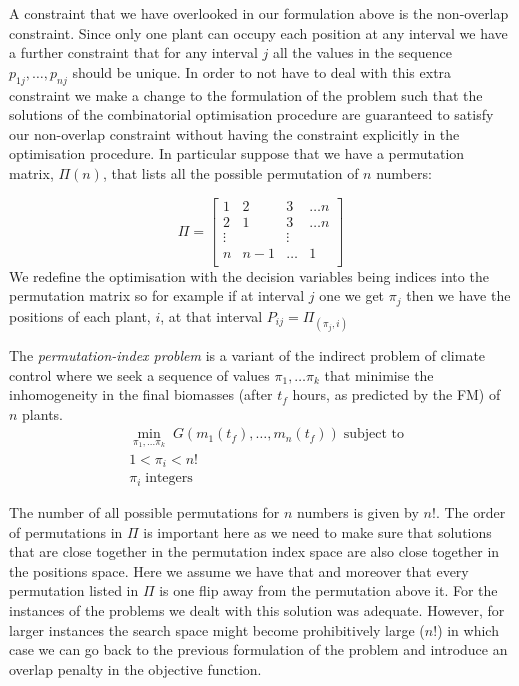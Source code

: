 \documentclass[phd]{infthesis}
\begin{document}
A constraint that we have overlooked in our formulation above is the non-overlap
constraint. Since only one plant can occupy each position at any interval we
have a further constraint that for any interval $j$ all the values in the
sequence $p_{1j}, \dots, p_{nj}$ should be unique. In order to not have to deal with
this extra constraint we make a change to the formulation of the problem such
that the solutions of the combinatorial optimisation procedure are guaranteed to
satisfy our non-overlap constraint without having the constraint explicitly in
the optimisation procedure. In particular suppose that we have a permutation
matrix, $\Pi(n)$, that lists all the possible permutation of $n$ numbers:

$$
\Pi = \begin{bmatrix} 
    1 & 2 & 3 & \dots n \\
    2 & 1 & 3 & \dots n \\
    \vdots &  & \vdots \\
    n &  n-1 & \dots  &  1 \\
    \end{bmatrix}
$$
We redefine the optimisation with the decision variables being indices into the
permutation matrix so for example if at interval $j$ one we get $\pi_j$ then we
have the positions of each plant, $i$, at that interval $P_{ij} = \Pi_{(\pi_j, i)}$

\begin{definition}
The \emph{permutation-index problem} is a variant of the indirect problem of
climate control where we seek a sequence of values $\pi_1, \dots \pi_k$ that minimise the
inhomogeneity in the final biomasses (after $t_f$ hours, as predicted by the FM)
of $n$ plants.
\begin{align*}
& \min_{\pi_1, \dots \pi_k} \; G(m_1(t_f), \dots, m_n(t_f)) \; \text{subject to} \\
& 1 < \pi_i < n! \\
& \pi_i \; \text{integers}
\end{align*}
\end{definition}

The number of all possible permutations for $n$ numbers is given by $n!$. The
order of permutations in $\Pi$ is important here as we need to make sure that
solutions that are close together in the permutation index space are also close
together in the positions space. Here we assume we have that and moreover that
every permutation listed in $\Pi$ is one flip away from the permutation above
it. For the instances of the problems we dealt with this solution was
adequate. However, for larger instances the search space might become
prohibitively large ($n!$) in which case we can go back to the previous
formulation of the problem and introduce an overlap penalty in the objective
function.
\end{document}
